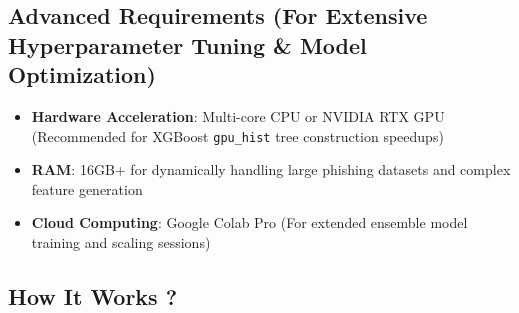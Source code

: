 \subsection{Advanced Requirements (For Extensive Hyperparameter Tuning \& Model Optimization)}

\begin{itemize}
\item \textbf{Hardware Acceleration}: Multi-core CPU or NVIDIA RTX GPU (Recommended for XGBoost \texttt{gpu\_hist} tree construction speedups)
\item \textbf{RAM}: 16GB+ for dynamically handling large phishing datasets and complex feature generation
\item \textbf{Cloud Computing}: Google Colab Pro (For extended ensemble model training and scaling sessions)
\end{itemize}

\subsection{How It Works ?}

